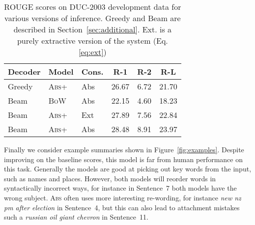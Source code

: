 \documentclass[11pt,a4paper]{article}
\begin{document}
\begin{table}
  \centering
  \small
  \begin{tabular}{lllccc}
    \toprule
    Decoder &  Model & Cons.     & R-1 & R-2 & R-L \\
    \midrule 
    Greedy & \textsc{Abs+} & Abs & 26.67& 6.72& 21.70 \\
    Beam & \textsc{BoW}   & Abs & 22.15& 4.60& 18.23 \\ 
    Beam & \textsc{Abs+}   & Ext & 27.89& 7.56& 22.84 \\ 
    Beam & \textsc{Abs+} & Abs & 28.48& 8.91& 23.97 \\ 
    \bottomrule
  \end{tabular}
  \caption{\small \label{tab:ablations} ROUGE scores on DUC-2003 development data for various versions of inference. Greedy and Beam are described in Section~\ref{sec:additional}. Ext. is a purely extractive version of the system (Eq. \ref{eq:ext}) \vspace{-0.4cm}}
\end{table}
Finally we consider example summaries shown in
Figure~\ref{fig:examples}.  Despite improving on the baseline scores,
this model is far from human performance on this task.  Generally the
models are good at picking out key words from the input, such as names and
places. However, both models will reorder words in syntactically
incorrect ways, for instance in Sentence~7 both models have the
wrong subject. \textsc{Abs} often uses 
more interesting re-wording, for instance \textit{new nz pm after election} 
in Sentence~4, but this can also lead to attachment mistakes such a \textit{russian oil giant chevron}
in Sentence~11.
\end{document}

